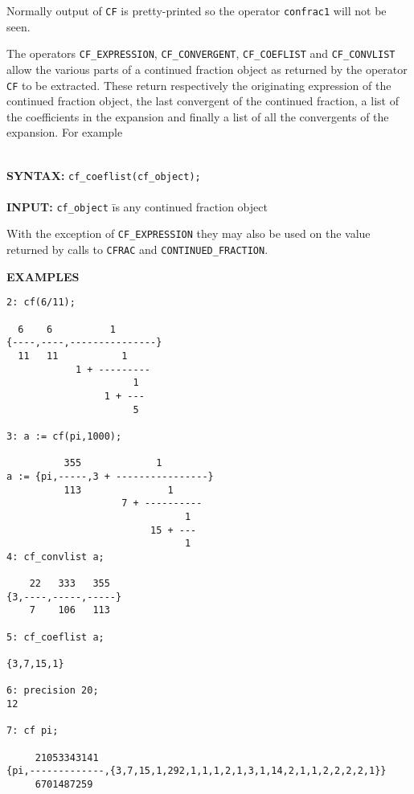 Normally output of \texttt{CF} is pretty-printed so the operator
\texttt{confrac1} will not be seen.

The operators \texttt{CF\_EXPRESSION}, \texttt{CF\_CONVERGENT},
\texttt{CF\_COEFLIST} and \texttt{CF\_CONVLIST} allow the various
parts of a continued fraction object as returned by the operator
\texttt{CF} to be extracted. These return respectively the originating
expression of the continued fraction object, the last convergent of the
continued fraction, a list of the coefficients in the expansion and finally
a list of all the convergents of the expansion.
For example
\begin{tabbing}
\\
{\bf SYNTAX:} \hspace{5mm} 
\= {\tt cf\_coeflist(cf\_object);}\\\\

{\bf INPUT:}
\> {\tt cf\_object} \hspace{3mm} \= is any continued fraction object \\ 
\end{tabbing}

With the exception of \texttt{CF\_EXPRESSION} they may also be used on the
value returned by calls to 
\texttt{CFRAC} and \texttt{CONTINUED\_FRACTION}. 
 
\large{\textbf{EXAMPLES}}
\begin{verbatim}
2: cf(6/11);

  6    6          1
{----,----,---------------}
  11   11           1
            1 + ---------
                      1
                 1 + ---
                      5

3: a := cf(pi,1000);

          355             1
a := {pi,-----,3 + ----------------}
          113               1
                    7 + ----------
                               1
                         15 + ---
                               1
4: cf_convlist a;

    22   333   355
{3,----,-----,-----}
    7    106   113

5: cf_coeflist a;

{3,7,15,1}

6: precision 20;
12

7: cf pi;

     21053343141
{pi,-------------,{3,7,15,1,292,1,1,1,2,1,3,1,14,2,1,1,2,2,2,2,1}}
     6701487259

\end{verbatim}


